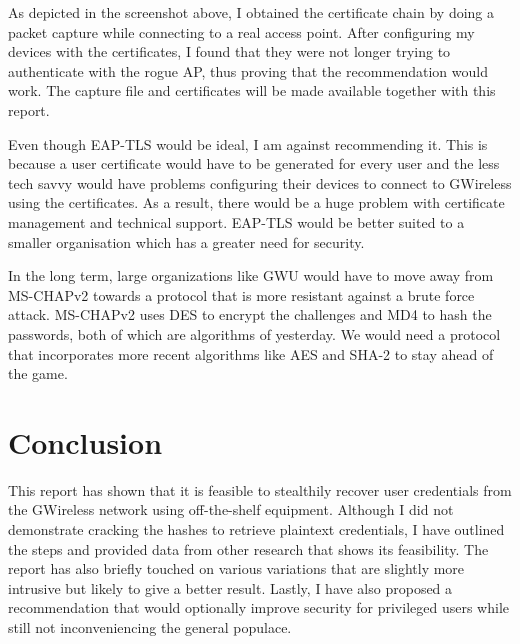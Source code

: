 \documentclass[twoside]{article}
\begin{document}
\begin{multicols}{2}

As depicted in the screenshot above, I obtained the certificate chain by doing a packet capture while connecting to a real access point. After configuring my devices with the certificates, I found that they were not longer trying to authenticate with the rogue AP, thus proving that the recommendation would work. The capture file and certificates will be made available together with this report. 

Even though EAP-TLS would be ideal, I am against recommending it. This is because a user certificate would have to be generated for every user and the less tech savvy would have problems configuring their devices to connect to GWireless using the certificates. As a result, there would be a huge problem with certificate management and technical support. EAP-TLS would be better suited to a smaller organisation which has a greater need for security.

In the long term, large organizations like GWU would have to move away from MS-CHAPv2 towards a protocol that is more resistant against a brute force attack. MS-CHAPv2 uses DES to encrypt the challenges and MD4 to hash the passwords, both of which are algorithms of yesterday. We would need a protocol that incorporates more recent algorithms like AES and SHA-2 to stay ahead of the game.



\section{Conclusion}

This report has shown that it is feasible to stealthily recover user credentials from the GWireless network using off-the-shelf equipment. Although I did not demonstrate cracking the hashes to retrieve plaintext credentials, I have outlined the steps and provided data from other research that shows its feasibility. The report has also briefly touched on various variations that are slightly more intrusive but likely to give a better result. Lastly, I have also proposed a recommendation that would optionally improve security for privileged users while still not inconveniencing the general populace. 

\end{multicols}
\end{document}
